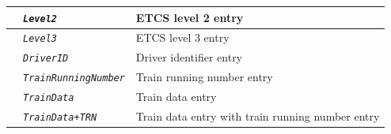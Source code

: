 \begin{itemize}
\begin{longtable}{|l|l|l|}
			\hline

			&	\begin{minipage}[t]{0.30\linewidth} \emph{\texttt{Level2}} \end{minipage}
			&	\begin{minipage}[t]{0.38\linewidth} ETCS level 2 entry \end{minipage} \\

			\hline

			&	\begin{minipage}[t]{0.30\linewidth} \emph{\texttt{Level3}} \end{minipage}
			&	\begin{minipage}[t]{0.38\linewidth} ETCS level 3 entry \end{minipage} \\

			\hline

			&	\begin{minipage}[t]{0.30\linewidth} \emph{\texttt{DriverID}} \end{minipage}
			&	\begin{minipage}[t]{0.38\linewidth} Driver identifier entry \end{minipage} \\

			\hline

			&	\begin{minipage}[t]{0.30\linewidth} \emph{\texttt{TrainRunningNumber}} \end{minipage}
			&	\begin{minipage}[t]{0.38\linewidth} Train running number entry \end{minipage} \\

			\hline

			&	\begin{minipage}[t]{0.30\linewidth} \emph{\texttt{TrainData}} \end{minipage}
			&	\begin{minipage}[t]{0.38\linewidth} Train data entry \end{minipage} \\

			\hline

			&	\begin{minipage}[t]{0.30\linewidth} \emph{\texttt{TrainData+TRN}} \end{minipage}
			&	\begin{minipage}[t]{0.38\linewidth} Train data entry with train running number entry \end{minipage} \\


\end{longtable}
\end{itemize}
